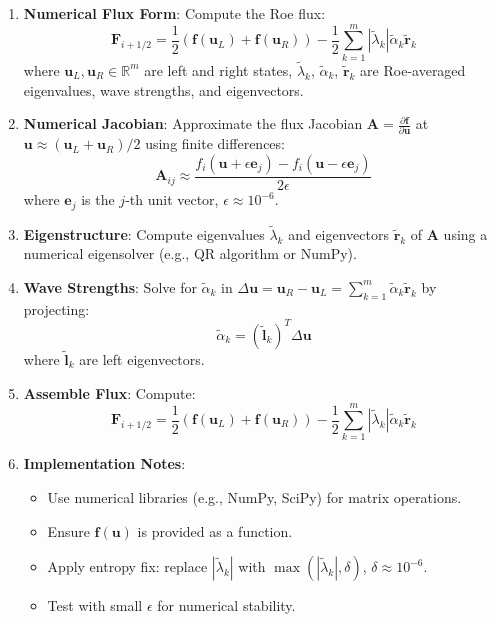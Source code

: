 \documentclass[12pt]{article}
\begin{document}
\begin{enumerate}
    \item \textbf{Numerical Flux Form}: Compute the Roe flux:
    \[
    \mathbf{F}_{i+1/2} = \frac{1}{2} \left( \mathbf{f}(\mathbf{u}_L) + \mathbf{f}(\mathbf{u}_R) \right) - \frac{1}{2} \sum_{k=1}^m |\tilde{\lambda}_k| \tilde{\alpha}_k \tilde{\mathbf{r}}_k
    \]
    where \(\mathbf{u}_L, \mathbf{u}_R \in \mathbb{R}^m\) are left and right states, \(\tilde{\lambda}_k\), \(\tilde{\alpha}_k\), \(\tilde{\mathbf{r}}_k\) are Roe-averaged eigenvalues, wave strengths, and eigenvectors.

    \item \textbf{Numerical Jacobian}: Approximate the flux Jacobian \(\mathbf{A} = \frac{\partial \mathbf{f}}{\partial \mathbf{u}}\) at \(\mathbf{u} \approx (\mathbf{u}_L + \mathbf{u}_R)/2\) using finite differences:
    \[
    \mathbf{A}_{ij} \approx \frac{f_i(\mathbf{u} + \epsilon \mathbf{e}_j) - f_i(\mathbf{u} - \epsilon \mathbf{e}_j)}{2\epsilon}
    \]
    where \(\mathbf{e}_j\) is the \(j\)-th unit vector, \(\epsilon \approx 10^{-6}\).

    \item \textbf{Eigenstructure}: Compute eigenvalues \(\tilde{\lambda}_k\) and eigenvectors \(\tilde{\mathbf{r}}_k\) of \(\mathbf{A}\) using a numerical eigensolver (e.g., QR algorithm or NumPy).

    \item \textbf{Wave Strengths}: Solve for \(\tilde{\alpha}_k\) in \(\Delta \mathbf{u} = \mathbf{u}_R - \mathbf{u}_L = \sum_{k=1}^m \tilde{\alpha}_k \tilde{\mathbf{r}}_k\) by projecting:
    \[
    \tilde{\alpha}_k = (\tilde{\mathbf{l}}_k)^T \Delta \mathbf{u}
    \]
    where \(\tilde{\mathbf{l}}_k\) are left eigenvectors.

    \item \textbf{Assemble Flux}: Compute:
    \[
    \mathbf{F}_{i+1/2} = \frac{1}{2} \left( \mathbf{f}(\mathbf{u}_L) + \mathbf{f}(\mathbf{u}_R) \right) - \frac{1}{2} \sum_{k=1}^m |\tilde{\lambda}_k| \tilde{\alpha}_k \tilde{\mathbf{r}}_k
    \]

    \item \textbf{Implementation Notes}:
    \begin{itemize}
        \item Use numerical libraries (e.g., NumPy, SciPy) for matrix operations.
        \item Ensure \(\mathbf{f}(\mathbf{u})\) is provided as a function.
        \item Apply entropy fix: replace \(|\tilde{\lambda}_k|\) with \(\max(|\tilde{\lambda}_k|, \delta)\), \(\delta \approx 10^{-6}\).
        \item Test with small \(\epsilon\) for numerical stability.
    \end{itemize}
\end{enumerate}
\end{document}
